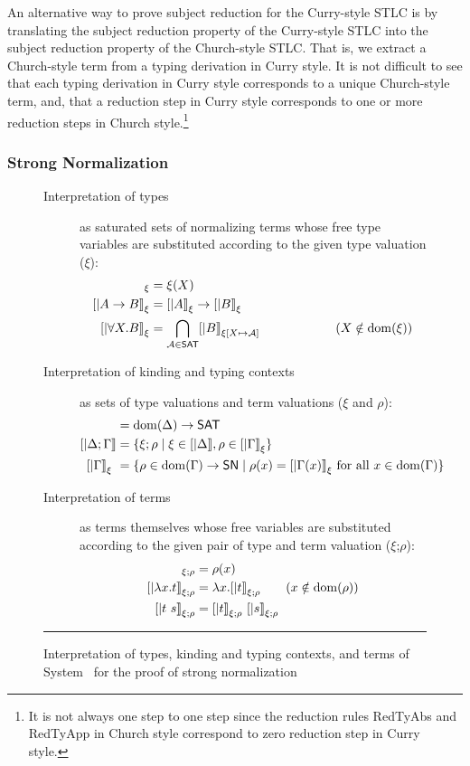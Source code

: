An alternative way to prove subject reduction for the Curry-style STLC is
by translating the subject reduction property of the Curry-style STLC into
the subject reduction property of the Church-style STLC. That is, we extract
a Church-style term from a typing derivation in Curry style. It is not
difficult to see that each typing derivation in Curry style corresponds to
a unique Church-style term, and, that a reduction step in Curry style
corresponds to one or more reduction steps in Church style.\footnote{
It is not always one step to one step since the reduction rules
{\sc RedTyAbs} and {\sc RedTyApp} in Church style correspond to
zero reduction step in Curry style.}

\subsubsection*{Strong Normalization}
\begin{figure}
\begin{singlespace}
\begin{description}
\item[Interpretation of types] as saturated sets of normalizing terms
	whose free type variables are substituted according to
	the given type valuation ($\xi$):
\begin{align*}
[| X |]_\xi           &= \xi(X) \\ 
[| A -> B |]_\xi      &= [|A|]_\xi -> [|B|]_\xi \\
[| \forall X.B |]_\xi &= \bigcap_{\mathcal{A}\in\SAT} [|B|]_{\xi[X\mapsto\mathcal{A}]} \qquad\qquad\qquad (X\notin\dom(\xi))
\end{align*}
\item[Interpretation of kinding and typing contexts]
       as sets of type valuations and term valuations ($\xi$ and $\rho$):
\begin{align*}
[| \Delta        |] &= \dom(\Delta) -> \SAT \\
[| \Delta;\Gamma |] &= \{ \xi;\rho \mid \xi\in[|\Delta|], \rho\in[|\Gamma|]_\xi \} \\
[| \Gamma        |]_\xi\ &= \{ \rho \in \dom(\Gamma) -> \SN \mid \rho(x)=[|\Gamma(x)|]_\xi ~\text{for all}~x\in\dom(\Gamma) \}
\end{align*}
\item[Interpretation of terms]
	as terms themselves whose free variables are substituted according to
	the given pair of type and term valuation ($\xi$;$\rho$):
\begin{align*}
[| x      |]_{\xi;\rho} &= \rho(x) \\
[| \l x.t |]_{\xi;\rho} &= \l x . [|t|]_{\xi;\rho} \qquad (x\notin\dom(\rho)) \\
[| t ~ s  |]_{\xi;\rho} &= [| t |]_{\xi;\rho} ~ [| s |]_{\xi;\rho}
\end{align*}
\end{description}
\caption[Interpretation of System \F\ for proving strong normalization]
	{Interpretation of types, kinding and typing contexts, and terms
		of System \F\ for the proof of strong normalization}
\label{fig:interpF}
\end{singlespace}
\vspace*{.3em}\hrule
\end{figure}
